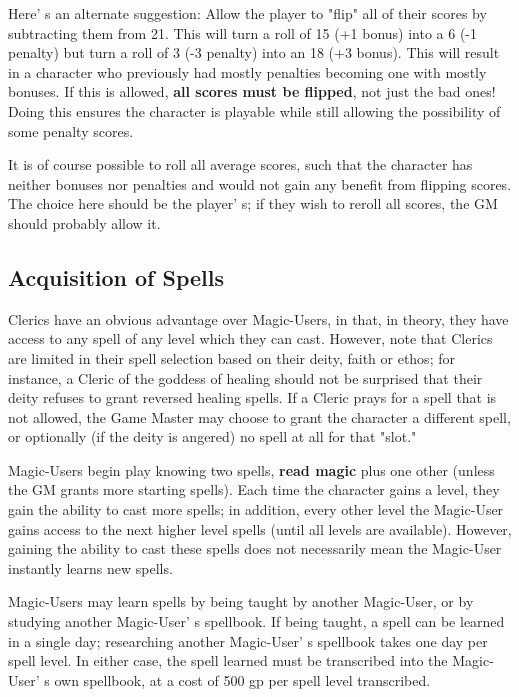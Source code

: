 \documentclass[a4paper,twoside,openany,10pt]{book}
\begin{document}
\begin{multicols}{2}
Here' s an alternate suggestion: Allow the player to "flip" all of their scores by subtracting them from 21. This will turn a roll of 15 (+1 bonus) into a 6 (-1 penalty) but turn a roll of 3 (-3 penalty) into an 18 (+3 bonus). This will result in a character who previously had mostly penalties becoming one with mostly bonuses. If this is allowed, \textbf{all scores must be flipped}, not just the bad ones! Doing this ensures the character is playable while still allowing the possibility of some penalty scores.

It is of course possible to roll all average scores, such that the character has neither bonuses nor penalties and would not gain any benefit from flipping scores. The choice here should be the player' s; if they wish to reroll all scores, the GM should probably allow it.

\subsection{Acquisition of Spells}\label{acquisition-of-spells}

Clerics have an obvious advantage over Magic-Users, in that, in theory, they have access to any spell of any level which they can cast. However, note that Clerics are limited in their spell selection based on their deity, faith or ethos; for instance, a Cleric of the goddess of healing should not be surprised that their deity refuses to grant reversed healing spells. If a Cleric prays for a spell that is not allowed, the Game Master may choose to grant the character a different spell, or optionally (if the deity is angered) no spell at all for that "slot."

Magic-Users begin play knowing two spells, \textbf{read magic} plus one other (unless the GM grants more starting spells). Each time the character gains a level, they gain the ability to cast more spells; in addition, every other level the Magic-User gains access to the next higher level spells (until all levels are available). However, gaining the ability to cast these spells does not necessarily mean the Magic-User instantly learns new spells.

Magic-Users may learn spells by being taught by another Magic-User, or by studying another Magic-User' s spellbook. If being taught, a spell can be learned in a single day; researching another Magic-User' s spellbook takes one day per spell level. In either case, the spell learned must be transcribed into the Magic-User' s own spellbook, at a cost of 500 gp per spell level transcribed.


\end{multicols}
\end{document}
